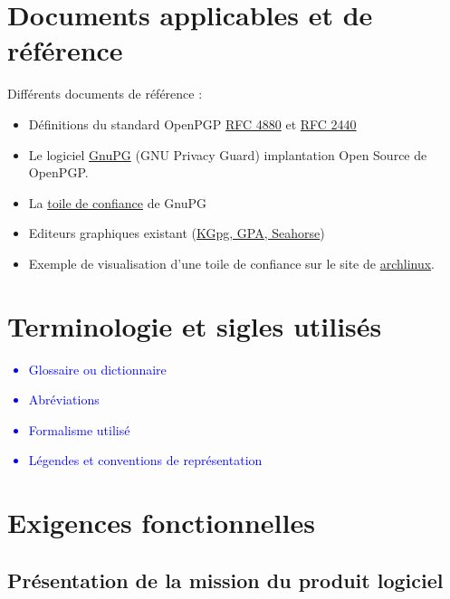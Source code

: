 \documentclass{../res/univ-projet}
\begin{document}
\section{Documents applicables et de référence}
Différents documents de référence :
\begin{itemize}
\item Définitions du standard OpenPGP \href{file:../../ressources/openPGP/rfc4880-en.pdf}{RFC 4880}
  et \href{file:../../ressources/openPGP/rfc2440-fr.pdf}{RFC 2440}
\item Le logiciel \href{https://www.gnupg.org/}{GnuPG} (GNU Privacy Guard) implantation Open Source
  de OpenPGP.
\item La \href{https://www.gnupg.org/gph/fr/manual.html#AEN541}{toile de confiance} de GnuPG
\item Editeurs graphiques existant 
  (\href{http://www.gnupg.org/related_software/frontends.en.html}{KGpg, GPA, Seahorse})
\item Exemple de visualisation d'une toile de confiance sur le site de 
  \href{https://www.archlinux.org/master-keys/#visualization}{archlinux}.
\end{itemize}

\section{Terminologie et sigles utilisés}
\textcolor{blue}{
  \begin{itemize}
  \item Glossaire ou dictionnaire
  \item Abréviations
  \item Formalisme utilisé
  \item Légendes et conventions de représentation
  \end{itemize}
}

\section{Exigences fonctionnelles}
\subsection{Présentation de la mission du produit logiciel}
\end{document}
